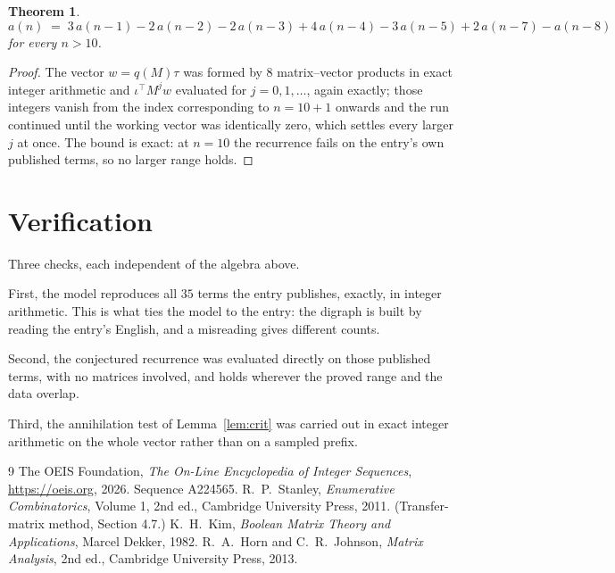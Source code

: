 \documentclass[11pt,a4paper]{article}
\theoremstyle{plain}
\newtheorem{theorem}{Theorem}
\theoremstyle{definition}
\begin{document}
\begin{theorem}
\[
a(n)\;=\;3\,a(n-1) - 2\,a(n-2) - 2\,a(n-3) + 4\,a(n-4) - 3\,a(n-5) + 2\,a(n-7) - a(n-8)
\]
for every $n>10$.
\end{theorem}

\begin{proof}
The vector $w=q(M)\tau$ was formed by $8$ matrix--vector products in exact integer
arithmetic and $\iota^{\!\top}M^{j}w$ evaluated for $j=0,1,\dots$, again exactly; those
integers vanish from the index corresponding to $n=10+1$ onwards and the run continued
until the working vector was identically zero, which settles every larger $j$ at once. The bound is exact: at $n=10$ the recurrence fails on the entry's own published terms, so no larger range holds.
\end{proof}

\section{Verification}

Three checks, each independent of the algebra above.

First, the model reproduces all $35$ terms the entry publishes, exactly, in integer
arithmetic. This is what ties the model to the entry: the digraph is built by reading the
entry's English, and a misreading gives different counts.

Second, the conjectured recurrence was evaluated directly on those published terms, with no
matrices involved, and holds wherever the proved range and the data overlap.

Third, the annihilation test of Lemma~\ref{lem:crit} was carried out in exact integer
arithmetic on the whole vector rather than on a sampled prefix.

\begin{thebibliography}{9}
 The OEIS Foundation, \emph{The On-Line Encyclopedia of Integer
Sequences}, \url{https://oeis.org}, 2026. Sequence A224565.
 R.~P.~Stanley, \emph{Enumerative Combinatorics}, Volume 1, 2nd ed.,
Cambridge University Press, 2011. (Transfer-matrix method, Section 4.7.)
 K.~H.~Kim, \emph{Boolean Matrix Theory and Applications}, Marcel Dekker,
1982.
 R.~A.~Horn and C.~R.~Johnson, \emph{Matrix Analysis}, 2nd ed., Cambridge
University Press, 2013.
\end{thebibliography}
\end{document}

